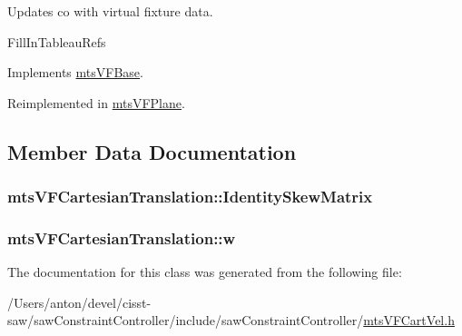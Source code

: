 Updates co with virtual fixture data. 

Fill\+In\+Tableau\+Refs 

Implements \hyperlink{classmts_v_f_base_aef5a28675f79945766a2b114c957ae6f}{mts\+V\+F\+Base}.



Reimplemented in \hyperlink{classmts_v_f_plane_a23097d9359e426edaf5584de27f2a696}{mts\+V\+F\+Plane}.



\subsection{Member Data Documentation}
\hypertarget{classmts_v_f_cartesian_translation_ac1142bba466b1bf454c1c5f9aed054f5}{}
\subsubsection[{Identity\+Skew\+Matrix}]{ mts\+V\+F\+Cartesian\+Translation\+::\+Identity\+Skew\+Matrix}\label{classmts_v_f_cartesian_translation_ac1142bba466b1bf454c1c5f9aed054f5}
\hypertarget{classmts_v_f_cartesian_translation_acce719308f90543b9c42b923ad079df4}{}
\subsubsection[{w}]{ mts\+V\+F\+Cartesian\+Translation\+::w}\label{classmts_v_f_cartesian_translation_acce719308f90543b9c42b923ad079df4}


The documentation for this class was generated from the following file\+:\begin{DoxyCompactItemize}
\item 
/\+Users/anton/devel/cisst-\/saw/saw\+Constraint\+Controller/include/saw\+Constraint\+Controller/\hyperlink{mts_v_f_cart_vel_8h}{mts\+V\+F\+Cart\+Vel.\+h}\end{DoxyCompactItemize}
